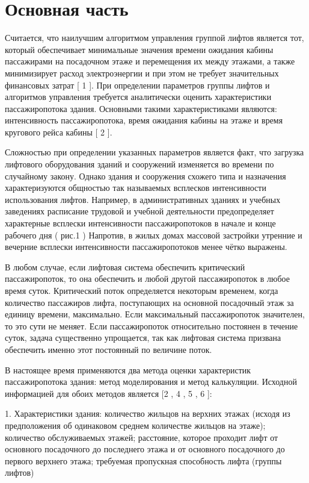 \section{ Основная часть}

	Считается, что наилучшим алгоритмом управления группой лифтов является тот, который обеспечивает минимальные значения
		времени ожидания кабины пассажирами на посадочном этаже и перемещения их между этажами, а также минимизирует расход
		электроэнергии и при этом не требует значительных финансовых затрат [ 1 ].
		При определении параметров группы лифтов и алгоритмов управления требуется аналитически оценить характеристики
		пассажиропотока здания.
		Основными такими характеристиками являются: интенсивность пассажиропотока, время ожидания кабины на этаже и время
		кругового рейса кабины [ 2 ].
		
	Сложностью при определении указанных параметров является факт, что загрузка лифтового
		оборудования зданий и сооружений изменяется во времени по случайному закону. Однако здания и сооружения схожего типа
		и назначения характеризуются общностью так называемых всплесков интенсивности использования лифтов.
		Например, в административных зданиях и учебных заведениях расписание трудовой и учебной деятельности предопределяет
		характерные всплески интенсивности пассажиропотоков в начале и конце рабочего дня ( рис.1 )
		Напротив, в жилых домах массовой застройки утренние и вечерние всплески интенсивности пассажиропотоков
		менее чётко выражены.

	В любом случае, если лифтовая система обеспечить критический пассажиропоток, то она обеспечить и любой другой пассажиропоток
		в любое время суток. Критический поток определяется некоторым временем, когда количество пассажиров лифта, поступающих на
		основной посадочный этаж за единицу времени, максимально. Если максимальный пассажиропоток значителен, то это сути не меняет.
		Если пассажиропоток относительно постоянен в течение суток, задача существенно упрощается, так как лифтовая система
		призвана обеспечить именно этот постоянный по величине поток.

	В настоящее время применяются два метода оценки характеристик пассажиропотока здания: метод моделирования и метод калькуляции.
		Исходной информацией для обоих методов является [2 , 4 , 5 , 6 ]:

	1. Характеристики здания: количество жильцов на верхних этажах (исходя из предположения об одинаковом среднем
		количестве жильцов на этаже); количество обслуживаемых этажей; расстояние, которое проходит лифт от основного посадочного
		до последнего этажа и от основного посадочного до первого верхнего этажа; требуемая пропускная способность лифта (группы лифтов)
		
